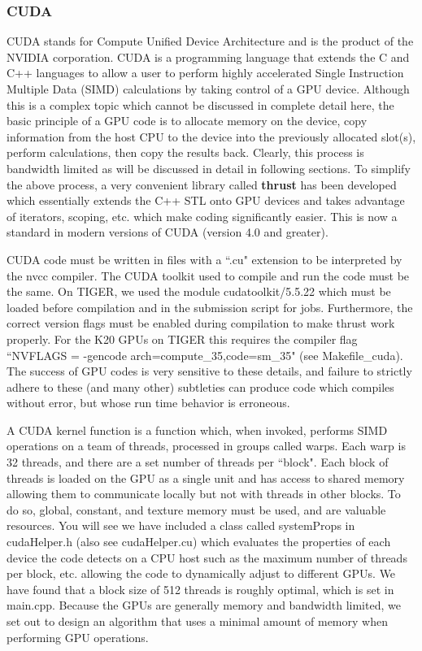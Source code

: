 \documentclass[12pt]{article}
\begin{document}
\subsubsection{CUDA}
CUDA stands for Compute Unified Device Architecture and is the product of the NVIDIA corporation.  CUDA is a programming language  that extends the C and C++ languages to allow a user to perform highly accelerated Single Instruction Multiple Data (SIMD) calculations by taking control of a GPU device.  Although this is a complex topic which cannot be discussed in complete detail here, the basic principle of a
GPU code is to allocate memory on the device, copy information from the host CPU to the device into the previously allocated slot(s), perform calculations, then copy the results back.  Clearly, this process is bandwidth limited as will be discussed in detail in following sections.  To simplify the above process, a very convenient library called \textbf{thrust} has been developed which essentially extends the C++ STL onto GPU devices and takes advantage of iterators, scoping, etc. which make coding significantly easier.  This is now a standard in modern versions of CUDA (version 4.0 and greater).

CUDA code must be written in files with a ``.cu" extension to be interpreted by the nvcc compiler.  The CUDA toolkit used to compile and run the code must be the same.  On TIGER, we used the module cudatoolkit/5.5.22 which must be loaded before compilation and in the submission script for jobs.  Furthermore, the correct version flags must be enabled during compilation to make thrust work properly.  For the K20 GPUs on TIGER this requires the compiler flag ``NVFLAGS = -gencode arch=compute\_35,code=sm\_35" (see Makefile\_cuda).  The success of GPU codes is very sensitive to these details, and failure to strictly adhere to these (and many other) subtleties can produce code which compiles without error, but whose run time behavior is erroneous.

A CUDA kernel function is a function which, when invoked, performs SIMD operations on a team of threads, processed in groups called warps.  Each warp is 32 threads, and there are a set number of threads per ``block".  Each block of threads is loaded on the GPU as a single unit and has access to shared memory allowing them to communicate locally but not with threads in other blocks.  To do so, global, constant, and texture memory must be used, and are valuable resources.  You will see we have included a class called systemProps in cudaHelper.h (also see cudaHelper.cu) which evaluates the properties of each device the code detects on a CPU host such as the maximum number of threads per block, etc. allowing the code to dynamically adjust to different GPUs.  We have found that a block size of 512 threads is roughly optimal, which is set in main.cpp.  Because the GPUs are generally memory and bandwidth limited, we set out to design an algorithm that uses a minimal amount of memory when performing GPU operations.
\end{document}
